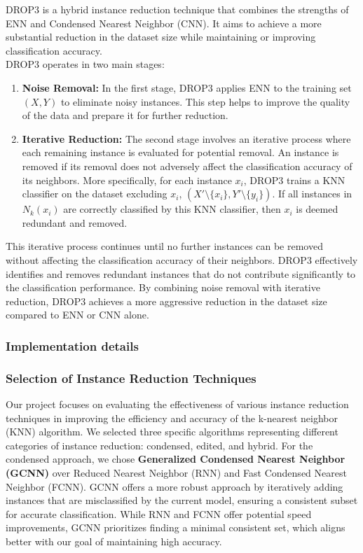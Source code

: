 DROP3 \cite{wilson2000reduction} is a hybrid instance reduction technique that combines the strengths of ENN and Condensed Nearest Neighbor (CNN). It aims to achieve a more substantial reduction in the dataset size while maintaining or improving classification accuracy.\\

DROP3 operates in two main stages:

\begin{enumerate}
    \item \textbf{Noise Removal:} In the first stage, DROP3 applies ENN to the training set $(X, Y)$ to eliminate noisy instances. This step helps to improve the quality of the data and prepare it for further reduction. 
    \item \textbf{Iterative Reduction:} The second stage involves an iterative process where each remaining instance is evaluated for potential removal. An instance is removed if its removal does not adversely affect the classification accuracy of its neighbors.  More specifically, for each instance $x_i$, DROP3 trains a KNN classifier on the dataset excluding $x_i$, $(X' \setminus \{x_i\}, Y' \setminus \{y_i\})$. If all instances in $N_k(x_i)$ are correctly classified by this KNN classifier, then $x_i$ is deemed redundant and removed.
\end{enumerate}

This iterative process continues until no further instances can be removed without affecting the classification accuracy of their neighbors. DROP3 effectively identifies and removes redundant instances that do not contribute significantly to the classification performance. By combining noise removal with iterative reduction, DROP3 achieves a more aggressive reduction in the dataset size compared to ENN or CNN alone.


\subsubsection{Implementation details}


\subsubsection*{Selection of Instance Reduction Techniques}
Our project focuses on evaluating the effectiveness of various instance reduction techniques in improving
the efficiency and accuracy of the k-nearest neighbor (KNN) algorithm.  We selected three specific algorithms
representing different categories of instance reduction: condensed, edited, and hybrid. For the condensed approach,
we chose \textbf{Generalized Condensed Nearest Neighbor (GCNN)} \cite{hart1968condensed} over 
Reduced Nearest Neighbor (RNN) and Fast Condensed Nearest Neighbor (FCNN). 
GCNN offers a more robust approach by iteratively adding instances that are misclassified by the current model,
ensuring a consistent subset for accurate classification. While RNN and FCNN offer potential speed improvements,
GCNN prioritizes finding a minimal consistent set, which aligns better with our goal of maintaining high accuracy.

